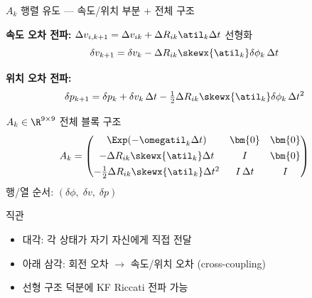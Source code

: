\begin{frame}[shrink=10]{$A_k$ 행렬 유도 — 속도/위치 부분 + 전체 구조}

  \textbf{속도 오차 전파:} $\Delta v_{i,k+1} = \Delta v_{ik} + \Delta R_{ik}\atil_k\Delta t$ 선형화
  \[
    \delta v_{k+1}
    = \delta v_k
      - \Delta R_{ik}\skewx{\atil_k}\delta\phi_k\,\Delta t
  \]

  \textbf{위치 오차 전파:}
  \[
    \delta p_{k+1}
    = \delta p_k
      + \delta v_k\,\Delta t
      - \tfrac{1}{2}\Delta R_{ik}\skewx{\atil_k}\delta\phi_k\,\Delta t^2
  \]

  \pause
  \begin{block}{$A_k \in \R^{9\times 9}$ 전체 블록 구조}
    \[
      A_k =
      \begin{pmatrix}
        \Exp(-\omegatil_k\Delta t)          & \bm{0}         & \bm{0} \\[4pt]
        -\Delta R_{ik}\skewx{\atil_k}\Delta t & I              & \bm{0} \\[4pt]
        -\tfrac{1}{2}\Delta R_{ik}\skewx{\atil_k}\Delta t^2 & I\,\Delta t & I
      \end{pmatrix}
    \]
    행/열 순서: $(\delta\phi,\;\delta v,\;\delta p)$
  \end{block}

  \pause
  \begin{exampleblock}{직관}
    \begin{itemize}
      \item 대각: 각 상태가 자기 자신에게 직접 전달
      \item 아래 삼각: 회전 오차 $\to$ 속도/위치 오차 (cross-coupling)
      \item 선형 구조 덕분에 KF Riccati 전파 가능
    \end{itemize}
  \end{exampleblock}
\end{frame}


